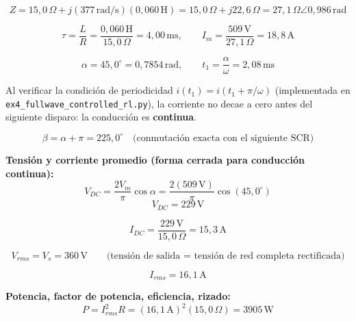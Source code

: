\documentclass[12pt,a4paper]{article}
\begin{document}
\begin{equation}
    Z = 15{,}0\,\Omega + j(377\,\text{rad/s})(0{,}060\,\text{H}) = 15{,}0\,\Omega+j22{,}6\,\Omega
    = \boxed{27{,}1\,\Omega\angle0{,}986\,\text{rad}}
\end{equation}

\begin{equation}
    \tau = \frac{L}{R} = \frac{0{,}060\,\text{H}}{15{,}0\,\Omega} = 4{,}00\,\text{ms}, \qquad
    I_m = \frac{509\,\text{V}}{27{,}1\,\Omega} = 18{,}8\,\text{A}
\end{equation}

\begin{equation}
    \alpha = 45{,}0^\circ = 0{,}7854\,\text{rad}, \qquad t_1 = \frac{\alpha}{\omega}
    = \boxed{2{,}08\,\text{ms}}
\end{equation}

Al verificar la condición de periodicidad $i(t_1)=i(t_1+\pi/\omega)$ (implementada
en \texttt{ex4\_fullwave\_controlled\_rl.py}), la corriente no decae a cero antes
del siguiente disparo: la conducción es \textbf{continua}.

\begin{equation}
    \beta = \alpha + \pi = 225{,}0^\circ \quad\text{(conmutación exacta con el siguiente SCR)}
\end{equation}

\textbf{Tensión y corriente promedio (forma cerrada para conducción continua):}
\begin{equation}
    V_{DC} = \frac{2V_m}{\pi}\cos\alpha = \frac{2(509\,\text{V})}{\pi}\cos(45{,}0^\circ)
\end{equation}
\begin{equation}
    \boxed{V_{DC} = 229\,\text{V}}
\end{equation}

\begin{equation}
    I_{DC} = \frac{229\,\text{V}}{15{,}0\,\Omega} = \boxed{15{,}3\,\text{A}}
\end{equation}

\begin{equation}
    V_{rms} = V_s = \boxed{360\,\text{V}} \qquad\text{(tensión de salida = tensión de red completa rectificada)}
\end{equation}

\begin{equation}
    I_{rms} = \boxed{16{,}1\,\text{A}}
\end{equation}

\textbf{Potencia, factor de potencia, eficiencia, rizado:}
\begin{equation}
    P = I_{rms}^2R = (16{,}1\,\text{A})^2(15{,}0\,\Omega) = \boxed{3905\,\text{W}}
\end{equation}
\end{document}
